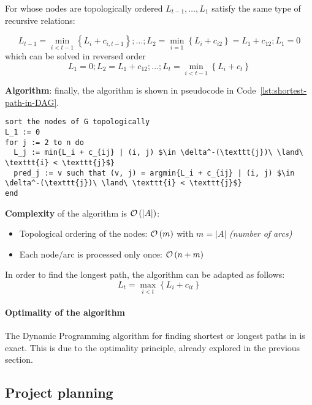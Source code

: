 \documentclass[english]{article}
\begin{document}
For \DAGs whose nodes are topologically ordered \(L_{t-1}, \ldots, L_1\) satisfy the same type of recursive relations:

\[ L_{t-1} = \displaystyle \min_{i < t-1} \left\{ L_i + c_{i, t-1} \right\}; \ldots; L_2 = \displaystyle \min_{i=1}\left\{ L_i + c_{i2} \right\} = L_1 + c_{12}; L_1 = 0 \]
which can be solved in reversed order
\[ L_1 = 0; L_2 = L_1 + c_{12}; \ldots; L_{t} = \displaystyle \min_{i < t - 1} \left\{ L_i + c_t \right\} \]

\bigskip
\textbf{Algorithm}:
finally, the algorithm is shown in pseudocode in Code~\ref{lst:shortest-path-in-DAG}.

\begin{lstlisting}[caption={Shortest path in \DAG}, label={lst:shortest-path-in-DAG}, float]
sort the nodes of G topologically
L_1 := 0
for j := 2 to n do
  L_j := min{L_i + c_{ij} | (i, j) $\in \delta^-(\texttt{j})\ \land\ \texttt{i} < \texttt{j}$}
  pred_j := v such that (v, j) = argmin{L_i + c_{ij} | (i, j) $\in \delta^-(\texttt{j})\ \land\ \texttt{i} < \texttt{j}$}
end
\end{lstlisting}

\bigskip
\textbf{Complexity}
of the algorithm is \(\mathcal{O}\left(|A|\right)\):

\begin{itemize}
  \item Topological ordering of the nodes: \(\mathcal{O}\left(m\right)\) with \(m = |A|\) \textit{(number of arcs)}
  \item Each node/arc is processed only once: \(\mathcal{O}\left(n+m\right)\)
\end{itemize}

\bigskip
In order to find the longest path, the algorithm can be adapted as follows:
\[L_t = \displaystyle \max_{i < t} \left\{ L_i + c_{it} \right\}\]

\paragraph{Optimality of the algorithm}

The Dynamic Programming algorithm for finding shortest or longest paths in \DAGs is exact.
This is due to the optimality principle, already explored in the previous section.

\subsection{Project planning}
\end{document}
